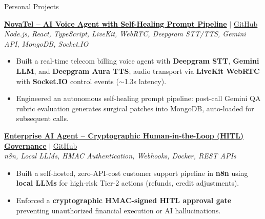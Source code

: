 \documentclass[10pt]{resume}
\begin{document}
\begin{rSection}{Personal Projects}

\textbf{\small\href{https://voice-agent-bhargavp.vercel.app}{NovaTel -- AI Voice Agent with Self-Healing Prompt Pipeline}}
{\small $|$ \href{https://github.com/Bhargav-Ponkiya/voice_agent}{GitHub}}\\
{\small\textit{Node.js, React, TypeScript, LiveKit, WebRTC, Deepgram STT/TTS, Gemini API, MongoDB, Socket.IO}}
\begin{itemize}[leftmargin=1.4em, itemsep=-0.38em, topsep=0.04em]
  \item Built a real-time telecom billing voice agent with \textbf{Deepgram STT}, \textbf{Gemini LLM}, and \textbf{Deepgram Aura TTS}; audio transport via \textbf{LiveKit WebRTC} with \textbf{Socket.IO} control events ($\sim$1.3s latency).
  \item Engineered an autonomous self-healing prompt pipeline: post-call Gemini QA rubric evaluation generates surgical patches into MongoDB, auto-loaded for subsequent calls.
\end{itemize}

\vspace{0.06em}

\textbf{\small\href{https://github.com/Bhargav-Ponkiya/n8n-hitl-ai-agent}{Enterprise AI Agent -- Cryptographic Human-in-the-Loop (HITL) Governance}}
{\small $|$ \href{https://github.com/Bhargav-Ponkiya/n8n-hitl-ai-agent}{GitHub}}\\
{\small\textit{n8n, Local LLMs, HMAC Authentication, Webhooks, Docker, REST APIs}}
\begin{itemize}[leftmargin=1.4em, itemsep=-0.38em, topsep=0.04em]
  \item Built a self-hosted, zero-API-cost customer support pipeline in \textbf{n8n} using \textbf{local LLMs} for high-risk Tier-2 actions (refunds, credit adjustments).
  \item Enforced a \textbf{cryptographic HMAC-signed HITL approval gate} preventing unauthorized financial execution or AI hallucinations.
\end{itemize}

\vspace{0.06em}


\end{rSection}
\end{document}
